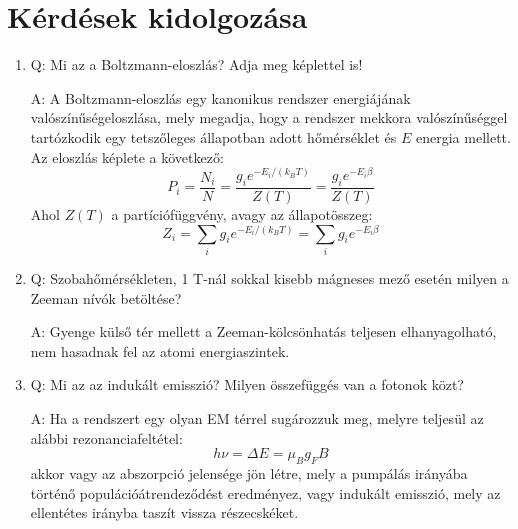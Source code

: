\section{Kérdések kidolgozása}
\begin{enumerate}
    \item Q: Mi az a Boltzmann-eloszlás? Adja meg képlettel is!
    \begin{displayquote}
        A: A Boltzmann-eloszlás egy kanonikus rendszer energiájának valószínűségeloszlása, mely megadja, hogy a rendszer mekkora valószínűséggel tartózkodik egy tetszőleges állapotban adott hőmérséklet és $E$ energia mellett. Az eloszlás képlete a következő:
        \begin{equation}
        P_{i}
        =
        \frac{N_{i}}{N}
        =
        \frac{g_{i} e^{-E_{i} / \left( k_{B} T \right)}}{Z \left( T \right)}
        =
        \frac{g_{i} e^{-E_{i} \beta}}{Z \left( T \right)}
        \end{equation}
Ahol $Z \left( T \right)$ a partíciófüggvény, avagy az állapotösszeg:
		\begin{equation}
		Z_{i}
		=
		\sum_{i} g_{i} e^{-E_{i} / \left( k_{B} T \right)}
		=
		\sum_{i} g_{i} e^{-E_{i} \beta}
		\end{equation}
    \end{displayquote}
	
    \item Q: Szobahőmérsékleten, 1 T-nál sokkal kisebb mágneses mező esetén milyen a Zeeman nívók betöltése?
    \begin{displayquote}
    	A: Gyenge külső tér mellett a Zeeman-kölcsönhatás teljesen elhanyagolható, nem hasadnak fel az atomi energiaszintek.
    \end{displayquote}
    
    \item Q: Mi az az indukált emisszió? Milyen összefüggés van a fotonok közt?
    \begin{displayquote}
    	A: Ha a rendszert egy olyan EM térrel sugározzuk meg, melyre teljesül az alábbi rezonanciafeltétel:
    		\begin{equation}
    		h\nu
    		=
    		\Delta E
    		=
    		\mu_{B} g_{F} B
    		\end{equation}
akkor vagy az abszorpció jelensége jön létre, mely a pumpálás irányába történő populációátrendeződést eredményez, vagy indukált emisszió, mely az ellentétes irányba taszít vissza részecskéket.
    \end{displayquote}
    

\end{enumerate}
